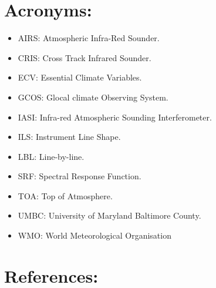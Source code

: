 \documentclass[twocolumn,10pt]{article}
\begin{document}
\section{Acronyms:}
\label{sec:orgheadline15}
\begin{itemize}
\item AIRS: Atmospheric Infra-Red Sounder.
\item CRIS: Cross Track Infrared Sounder.
\item ECV: Essential Climate Variables.
\item GCOS: Glocal climate Observing System.
\item IASI: Infra-red Atmospheric Sounding Interferometer.
\item ILS: Instrument Line Shape.
\item LBL: Line-by-line.
\item SRF: Spectral Response Function.
\item TOA: Top of Atmosphere.
\item UMBC: University of Maryland Baltimore County.
\item WMO: World Meteorological Organisation
\end{itemize}

\section{References:}
\label{sec:orgheadline16}
\end{document}
